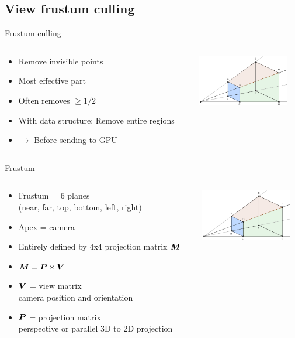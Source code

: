 \documentclass{beamer}
\begin{document}
\subsection{View frustum culling}

\begin{frame}{Frustum culling}
	\begin{columns}[c]
	\begin{column}[T]{.6\textwidth}
		\begin{itemize}
		\item Remove invisible points
		\item Most effective part
		\item Often removes $\geq 1/2$
		\item With data structure: Remove entire regions
		\item $\rightarrow$ Before sending to GPU
		\end{itemize}
	\end{column}
	\begin{column}[T]{.4\textwidth}
		\includegraphics[width=4cm]{frustum.png}
	\end{column}
	\end{columns}
\end{frame}

\begin{frame}{Frustum}
	\begin{columns}[c]
	\begin{column}[T]{.6\textwidth}
		\begin{itemize}
		\item Frustum = 6 planes \\
		(near, far, top, bottom, left, right)
		\item Apex = camera
		\item Entirely defined by 4x4 projection matrix $\matrixsym{M}$
		\item $\matrixsym{M} = \matrixsym{P} \times \matrixsym{V}$
		\item $\matrixsym{V}$ = view matrix \\
		camera position and orientation
		\item $\matrixsym{P}$ = projection matrix \\
		perspective or parallel 3D to 2D projection
		\end{itemize}
	\end{column}
	\begin{column}[T]{.4\textwidth}
		\includegraphics[width=4cm]{frustum.png}
	\end{column}
	\end{columns}
\end{frame}
\end{document}
